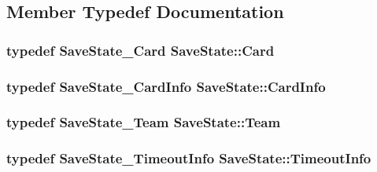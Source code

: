 \subsection{Member Typedef Documentation}
\hypertarget{class_save_state_aac93841636d6a251481a54747d72a6bb}{
\subsubsection[{Card}]{\setlength{\rightskip}{0pt plus 5cm}typedef {\bf Save\-State\-\_\-\-Card} {\bf Save\-State\-::\-Card}}}\label{class_save_state_aac93841636d6a251481a54747d72a6bb}
\hypertarget{class_save_state_abde3f0857a29132cb744d13e816210ab}{
\subsubsection[{Card\-Info}]{\setlength{\rightskip}{0pt plus 5cm}typedef {\bf Save\-State\-\_\-\-Card\-Info} {\bf Save\-State\-::\-Card\-Info}}}\label{class_save_state_abde3f0857a29132cb744d13e816210ab}
\hypertarget{class_save_state_ace00ccb64c1251c8125f66dbb0ef6e17}{
\subsubsection[{Team}]{\setlength{\rightskip}{0pt plus 5cm}typedef {\bf Save\-State\-\_\-\-Team} {\bf Save\-State\-::\-Team}}}\label{class_save_state_ace00ccb64c1251c8125f66dbb0ef6e17}
\hypertarget{class_save_state_a2694fe3d48366ec4922d7b3d91eae0bf}{
\subsubsection[{Timeout\-Info}]{\setlength{\rightskip}{0pt plus 5cm}typedef {\bf Save\-State\-\_\-\-Timeout\-Info} {\bf Save\-State\-::\-Timeout\-Info}}}\label{class_save_state_a2694fe3d48366ec4922d7b3d91eae0bf}


